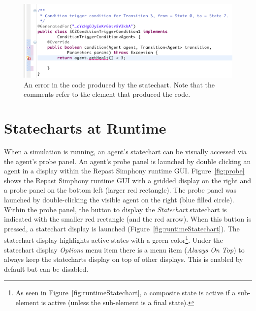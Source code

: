 \documentclass[11pt]{amsart}
\begin{document}
\begin{figure}
\begin{center}
\vspace{.2in}
\centerline {
\includegraphics[width=5.5in]{StatechartsImages/code_error.png}
}
\caption{An error in the code produced by the statechart. Note that the comments refer to the element that produced the code.}
\label{fig:codeerror}
\end{center}
\end{figure}


\section{Statecharts at Runtime}
\label{sec:runtime}
When a simulation is running, an agent's statechart can be visually accessed via the agent's probe panel. An agent's probe panel is launched by double clicking an agent in a display within the Repast Simphony runtime GUI. Figure~\ref{fig:probe} shows the Repast Simphony runtime GUI with a gridded display on the right and a probe panel on the bottom left (larger red rectangle). The probe panel was launched by double-clicking the visible agent on the right (blue filled circle). Within the probe panel, the button to display the \emph{Statechart} statechart is indicated with the smaller red rectangle (and the red arrow). When this button is pressed, a statechart display is launched (Figure~\ref{fig:runtimeStatechart}). The statechart display highlights active states with a green color\footnote{As seen in Figure~\ref{fig:runtimeStatechart}, a composite state is active if a sub-element is active (unless the sub-element is a final state).}. Under the statechart display \emph{Options} menu item there is a menu item (\emph{Always On Top}) to always keep the statecharts display on top of other displays. This is enabled by default but can be disabled.
\end{document}
